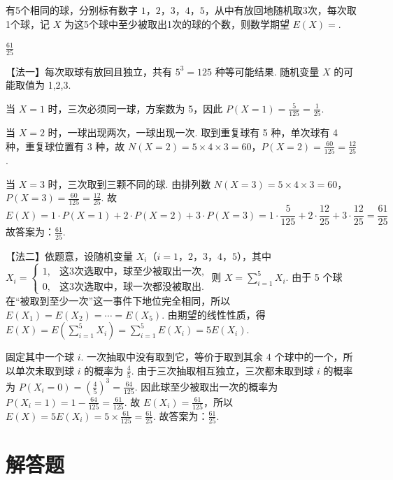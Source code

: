 \begin{problem}
有5个相同的球，分别标有数字 \(1\)，\(2\)，\(3\)，\(4\)，\(5\)，从中有放回地随机取3次，每次取1个球，记 \(X\) 为这5个球中至少被取出1次的球的个数，则数学期望 \(E(X) =\)\fillinblank{}.
\end{problem}

\begin{answer}
\(\frac{61}{25}\)
\end{answer}

\begin{solution}
【法一】每次取球有放回且独立，共有
\(5^3=125\) 种等可能结果. 随机变量 \(X\) 的可能取值为 1,2,3.

当 \(X=1\) 时，三次必须同一球，方案数为 5，因此 \(P(X=1)=\frac{5}{125}=\frac{1}{25}\).

当 \(X=2\) 时，一球出现两次，一球出现一次. 取到重复球有 5 种，单次球有 4 种，重复球位置有 3 种，故 \(N(X=2)=5\times4\times3=60\)，\(P(X=2)=\frac{60}{125}=\frac{12}{25}\).

当 \(X=3\) 时，三次取到三颗不同的球. 由排列数 \(N(X=3)=5\times4\times3=60\)，\(P(X=3)=\frac{60}{125}=\frac{12}{25}\).
故
\[
E(X)=1\cdot P(X=1)+2\cdot P(X=2)+3\cdot P(X=3)=1\cdot\frac{5}{125}+2\cdot\frac{12}{25}+3\cdot\frac{12}{25}=\frac{61}{25}
\]
故答案为：\(\frac{61}{25}\).

【法二】依题意，设随机变量 \(X_i\)（\(i=1\)，\(2\)，\(3\)，\(4\)，\(5\)），其中
\(
X_i=
\begin{cases}
1, & \text{这3次选取中，球至少被取出一次},\\
0, & \text{这3次选取中，球一次都没被取出}.
\end{cases}
\)
则 \(X=\sum_{i=1}^5 X_i\).
由于 5 个球在“被取到至少一次”这一事件下地位完全相同，所以 \(E(X_1)=E(X_2)=\cdots=E(X_5)\). 由期望的线性性质，得 \(E(X)=E\left(\sum_{i=1}^5 X_i\right)=\sum_{i=1}^5 E(X_i)=5E(X_i)\).

固定其中一个球 \(i\). 一次抽取中没有取到它，等价于取到其余 \(4\) 个球中的一个，所以单次未取到球 \(i\) 的概率为 \(\frac{4}{5}\). 由于三次抽取相互独立，三次都未取到球 \(i\) 的概率为 \(P(X_i=0)=\left(\frac{4}{5}\right)^3=\frac{64}{125}\). 因此球至少被取出一次的概率为 \(P(X_i=1)=1-\frac{64}{125}=\frac{61}{125}\). 故 \(E(X_i)=\frac{61}{125}\)，所以 \(E(X)=5E(X_i)=5\times\frac{61}{125}=\frac{61}{25}\).
故答案为：\(\frac{61}{25}\).
\end{solution}
\section{解答题}

